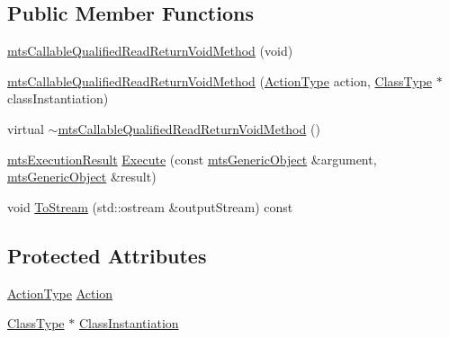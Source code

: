 \subsection*{Public Member Functions}
\begin{DoxyCompactItemize}
\item 
\hyperlink{classmts_callable_qualified_read_return_void_method_a82517eb2351f0065434298d074d6c73e}{mts\+Callable\+Qualified\+Read\+Return\+Void\+Method} (void)
\item 
\hyperlink{classmts_callable_qualified_read_return_void_method_a1d137b2c220e73ca6c1efc1f4842129b}{mts\+Callable\+Qualified\+Read\+Return\+Void\+Method} (\hyperlink{classmts_callable_qualified_read_return_void_method_a90bf5eae1c7fdee0396313ce6de022bb}{Action\+Type} action, \hyperlink{classmts_callable_qualified_read_return_void_method_ae99cfab8208eb374f2cdf01c97edfa3b}{Class\+Type} $\ast$class\+Instantiation)
\item 
virtual \hyperlink{classmts_callable_qualified_read_return_void_method_a7a3d67f45cd55cdba171853ae6484c4f}{$\sim$mts\+Callable\+Qualified\+Read\+Return\+Void\+Method} ()
\item 
\hyperlink{classmts_execution_result}{mts\+Execution\+Result} \hyperlink{classmts_callable_qualified_read_return_void_method_ac347ad8cf790fb4094f9ac9c1d4cc70a}{Execute} (const \hyperlink{classmts_generic_object}{mts\+Generic\+Object} \&argument, \hyperlink{classmts_generic_object}{mts\+Generic\+Object} \&result)
\item 
void \hyperlink{classmts_callable_qualified_read_return_void_method_a269843820d9e3ae43bcdd51b0c5c6190}{To\+Stream} (std\+::ostream \&output\+Stream) const 
\end{DoxyCompactItemize}
\subsection*{Protected Attributes}
\begin{DoxyCompactItemize}
\item 
\hyperlink{classmts_callable_qualified_read_return_void_method_a90bf5eae1c7fdee0396313ce6de022bb}{Action\+Type} \hyperlink{classmts_callable_qualified_read_return_void_method_ac7d58d66c42aa3c1071a121762b2d7fb}{Action}
\item 
\hyperlink{classmts_callable_qualified_read_return_void_method_ae99cfab8208eb374f2cdf01c97edfa3b}{Class\+Type} $\ast$ \hyperlink{classmts_callable_qualified_read_return_void_method_ace93cdd3d5c06f66479ab1e1cd29ece3}{Class\+Instantiation}
\end{DoxyCompactItemize}


